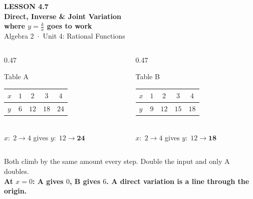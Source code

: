 \documentclass[aspectratio=169, 11pt]{beamer}
\begin{document}
{
\begin{frame}[plain]
  \vspace{2.8cm}\hspace{0.55cm}%
  \begin{minipage}{0.9\textwidth}
    {\color{goldacc}\bfseries\small LESSON 4.7}\\[0.5cm]
    {\color{white}\bfseries\LARGE Direct, Inverse \& Joint Variation}\\[0.35cm]
    {\color{white}\bfseries\large where $y=\frac kx$ goes to work}\\[1.0cm]
    {\color{forestmid}\small Algebra 2~$\cdot$~Unit 4: Rational Functions}
  \end{minipage}
\end{frame}
}

\begin{frame}[t, plain]
  \begin{columns}[T]
    \begin{column}{0.47\textwidth}
      \begin{block}{Table A}
        \centering
        \renewcommand{\arraystretch}{1.3}
        \begin{tabular}{|l|c|c|c|c|}
        \hline
        $x$ & $1$ & $2$ & $3$ & $4$ \\ \hline
        $y$ & $6$ & $12$ & $18$ & $24$ \\ \hline
        \end{tabular}\\[4pt]
        $x:\;2\to4$ \; gives \; $y:\;12\to\mathbf{24}$
      \end{block}
    \end{column}
    \begin{column}{0.47\textwidth}
      \begin{block}{Table B}
        \centering
        \renewcommand{\arraystretch}{1.3}
        \begin{tabular}{|l|c|c|c|c|}
        \hline
        $x$ & $1$ & $2$ & $3$ & $4$ \\ \hline
        $y$ & $9$ & $12$ & $15$ & $18$ \\ \hline
        \end{tabular}\\[4pt]
        $x:\;2\to4$ \; gives \; $y:\;12\to\mathbf{18}$
      \end{block}
    \end{column}
  \end{columns}
  \vspace{8pt}
  \begin{block}{}
    \centering Both climb by the same amount every step. Double the input and only A doubles. \\[3pt]
    \textbf{At $x=0$: A gives $0$, B gives $6$. A direct variation is a line through the origin.}
  \end{block}
\end{frame}
\end{document}
